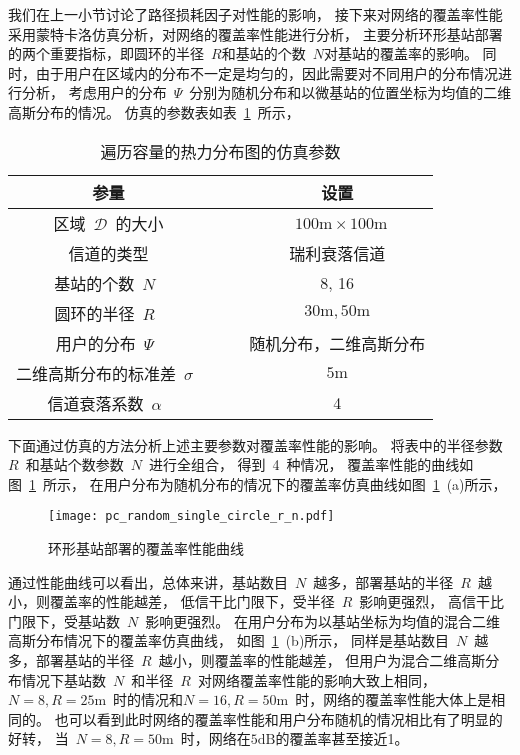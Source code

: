 我们在上一小节讨论了路径损耗因子对性能的影响，
接下来对网络的覆盖率性能采用蒙特卡洛仿真分析，对网络的覆盖率性能进行分析，
主要分析环形基站部署的两个重要指标，即圆环的半径~$R$和基站的个数~$N$对基站的覆盖率的影响。
同时，由于用户在区域内的分布不一定是均匀的，因此需要对不同用户的分布情况进行分析，
考虑用户的分布~$\Psi$~分别为随机分布和以微基站的位置坐标为均值的二维高斯分布的情况。
仿真的参数表如表~\ref{single_circle_pc_sim_para}~所示，
\begin{table}[htbp]
\caption{遍历容量的热力分布图的仿真参数}
\label{single_circle_pc_sim_para}
\vspace{0.5em}\centering\wuhao
\begin{tabular}{cccc}
\toprule[1.5pt]
参量 & & & 设置 \\
\midrule[0.5pt]
区域~$\mathcal{D}$~的大小  & & & ~$100\mathrm{m} \times 100 \mathrm{m}$ \\
信道的类型 & & &  瑞利衰落信道\\
基站的个数~$N$~ & & &  8, 16\\
圆环的半径~$R$~ & & &  ${30\mathrm{m}},{50\mathrm{m}}$\\
用户的分布~$\Psi$~ & & & 随机分布，二维高斯分布\\
二维高斯分布的标准差~$\sigma$~ & & & ${5\mathrm{m}}$\\
信道衰落系数~$\alpha$~  & & & 4\\
\bottomrule[1.5pt]
\end{tabular}
\end{table}
下面通过仿真的方法分析上述主要参数对覆盖率性能的影响。
将表中的半径参数~$R$~和基站个数参数~$N$~进行全组合，
得到~4~种情况，
覆盖率性能的曲线如图~\ref{pc_random_single_circle_r_n}~所示，
在用户分布为随机分布的情况下的覆盖率仿真曲线如图~\ref{pc_random_single_circle_r_n}~(a)所示，
\begin{figure}[htbp]
\centering
\texttt{[image: pc\_random\_single\_circle\_r\_n.pdf]}
\caption{环形基站部署的覆盖率性能曲线}\vspace{-0.5em}
\label{pc_random_single_circle_r_n}
\end{figure}
通过性能曲线可以看出，总体来讲，基站数目~$N$~越多，部署基站的半径~$R$~越小，则覆盖率的性能越差，
低信干比门限下，受半径~$R$~影响更强烈，
高信干比门限下，受基站数~$N$~影响更强烈。
在用户分布为以基站坐标为均值的混合二维高斯分布情况下的覆盖率仿真曲线，
如图~\ref{pc_random_single_circle_r_n}~(b)所示，
同样是基站数目~$N$~越多，部署基站的半径~$R$~越小，则覆盖率的性能越差，
但用户为混合二维高斯分布情况下基站数~$N$~和半径~$R$~对网络覆盖率性能的影响大致上相同，
$N=8,R=25\mathrm{m}$~时的情况和$N=16,R=50\mathrm{m}$~时，网络的覆盖率性能大体上是相同的。
也可以看到此时网络的覆盖率性能和用户分布随机的情况相比有了明显的好转，
当~$N=8,R=50\mathrm{m}$~时，网络在$5\mathrm{dB}$的覆盖率甚至接近1。

